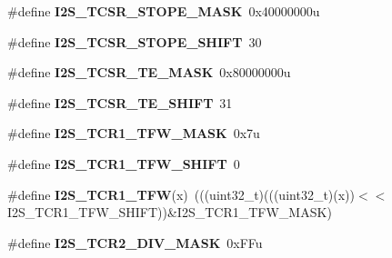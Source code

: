 \begin{DoxyCompactItemize}
\item 
\#define {\bfseries I2\+S\+\_\+\+T\+C\+S\+R\+\_\+\+S\+T\+O\+P\+E\+\_\+\+M\+A\+SK}~0x40000000u\hypertarget{group__I2S__Register__Masks_ga2692628bf911b8951e8f77dbd6809f87}{}\label{group__I2S__Register__Masks_ga2692628bf911b8951e8f77dbd6809f87}

\item 
\#define {\bfseries I2\+S\+\_\+\+T\+C\+S\+R\+\_\+\+S\+T\+O\+P\+E\+\_\+\+S\+H\+I\+FT}~30\hypertarget{group__I2S__Register__Masks_ga931d31ce7c806e53554e29d7cf0db6ed}{}\label{group__I2S__Register__Masks_ga931d31ce7c806e53554e29d7cf0db6ed}

\item 
\#define {\bfseries I2\+S\+\_\+\+T\+C\+S\+R\+\_\+\+T\+E\+\_\+\+M\+A\+SK}~0x80000000u\hypertarget{group__I2S__Register__Masks_ga38911a5988cffd69ad0817c00522518c}{}\label{group__I2S__Register__Masks_ga38911a5988cffd69ad0817c00522518c}

\item 
\#define {\bfseries I2\+S\+\_\+\+T\+C\+S\+R\+\_\+\+T\+E\+\_\+\+S\+H\+I\+FT}~31\hypertarget{group__I2S__Register__Masks_gab02a94b13756ac9869d4125313c7d651}{}\label{group__I2S__Register__Masks_gab02a94b13756ac9869d4125313c7d651}

\item 
\#define {\bfseries I2\+S\+\_\+\+T\+C\+R1\+\_\+\+T\+F\+W\+\_\+\+M\+A\+SK}~0x7u\hypertarget{group__I2S__Register__Masks_ga26d9f7626514208432dc7850225cc752}{}\label{group__I2S__Register__Masks_ga26d9f7626514208432dc7850225cc752}

\item 
\#define {\bfseries I2\+S\+\_\+\+T\+C\+R1\+\_\+\+T\+F\+W\+\_\+\+S\+H\+I\+FT}~0\hypertarget{group__I2S__Register__Masks_ga2a0a40da6ee3bcfa9f8088dcfbb676c7}{}\label{group__I2S__Register__Masks_ga2a0a40da6ee3bcfa9f8088dcfbb676c7}

\item 
\#define {\bfseries I2\+S\+\_\+\+T\+C\+R1\+\_\+\+T\+FW}(x)~(((uint32\+\_\+t)(((uint32\+\_\+t)(x))$<$$<$I2\+S\+\_\+\+T\+C\+R1\+\_\+\+T\+F\+W\+\_\+\+S\+H\+I\+FT))\&I2\+S\+\_\+\+T\+C\+R1\+\_\+\+T\+F\+W\+\_\+\+M\+A\+SK)\hypertarget{group__I2S__Register__Masks_gad9addcfc5012395e9d579bdf7091dddc}{}\label{group__I2S__Register__Masks_gad9addcfc5012395e9d579bdf7091dddc}

\item 
\#define {\bfseries I2\+S\+\_\+\+T\+C\+R2\+\_\+\+D\+I\+V\+\_\+\+M\+A\+SK}~0x\+F\+Fu\hypertarget{group__I2S__Register__Masks_ga9bbd597b1d3a839f74d15c3b6c309bb7}{}\label{group__I2S__Register__Masks_ga9bbd597b1d3a839f74d15c3b6c309bb7}


\end{DoxyCompactItemize}
